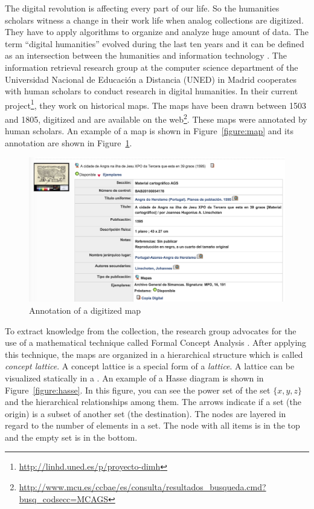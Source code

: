 \documentclass[11pt]{report}
\begin{document}
The digital revolution is affecting every part of our life. So the humanities scholars witness a change in their work life when analog collections are digitized. They have to apply algorithms to organize and analyze huge amount of data. The term ``digital humanities'' evolved during the last ten years and it can be defined as an intersection between the humanities and information technology  \cite{Svensson2010}. The information retrieval research group at the computer science department of the Universidad Nacional de Educación a Distancia (UNED) in Madrid cooperates with human scholars to conduct research in digital humanities. In their current project\footnote{\url{http://linhd.uned.es/p/proyecto-dimh}}, they work on historical maps. The maps have been drawn between 1503 and 1805, digitized and are available on the web\footnote{\url{http://www.mcu.es/ccbae/es/consulta/resultados_busqueda.cmd?busq_codsecc=MCAGS}}. These maps were annotated by human scholars. An example of a map is shown in Figure~\ref{figure:map} and its annotation are shown in Figure~\ref{figure:metadata}.\\

\begin{figure}[!ht]
	\centering
	\includegraphics[width=\linewidth]{./images/metadata}
\caption{Annotation of a digitized map}
\label{figure:metadata}
\end{figure}

To extract knowledge from the collection, the research group advocates \cite{Castellanos,Cigarran} for the use of a mathematical technique called Formal Concept Analysis \cite{Ganter2012}. After applying this technique, the maps are organized in a hierarchical structure which is called \textit{concept lattice}. A concept lattice is a special form of a \textit{lattice}. A lattice can be visualized statically in a . An example of a Hasse diagram is shown in Figure~\ref{figure:hasse}. In this figure, you can see the power set of the set $\{x,y,z\}$ and the hierarchical relationships among them. The arrows indicate if a set (the origin) is a subset of another set (the destination). The nodes are layered in regard to the number of elements in a set. The node with all items is in the top and the empty set is in the bottom.\\
\end{document}
